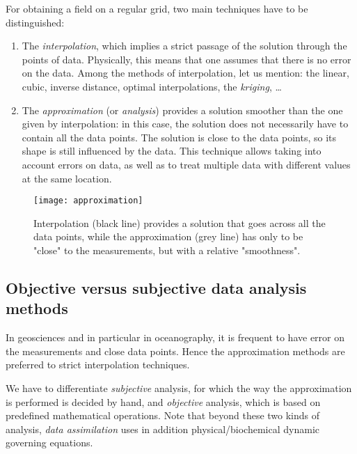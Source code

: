 For obtaining a field on a regular grid, two main techniques have to be distinguished:

\begin{enumerate}

\item The \textit{interpolation}, which implies a strict passage of the solution through the points of data. Physically, this means that one assumes that there is no error on the data. Among the methods of interpolation, let us mention: the linear, cubic, inverse distance, optimal interpolations, the \textit{kriging}, \ldots

\item The \textit{approximation} (or \textit{analysis}) provides a solution smoother than the one given by interpolation: in this case, the solution does not necessarily have to contain all the data points. The solution is close to the data points, so its shape is still influenced by the data. This technique allows taking into account errors on data, as well as to treat multiple data with different values at the same location. 
\end{enumerate}

\begin{figure}[htpb]
	\centering
	\parbox{.5\textwidth}{
		\texttt{[image: approximation]}
		}\parbox{.5\textwidth}{
		\caption[Interpolation vs. approximation.]{Interpolation (black line) provides a solution that goes across all the data points, while the approximation (grey line) has only to be "close" to the measurements, but with a relative "smoothness".}
		}
\end{figure}


\subsection{Objective versus subjective data analysis methods\label{sec:gridding}}

In geosciences and in particular in oceanography, it is frequent to have error on the measurements and close data points. Hence the approximation methods are preferred to strict interpolation techniques.

We have to differentiate \textit{subjective} analysis, for which the way the approximation is performed is decided by hand, and \textit{objective} analysis, which is based on predefined mathematical operations. Note that beyond these two kinds of analysis, \textit{data assimilation} uses in addition physical/biochemical dynamic governing equations. 

